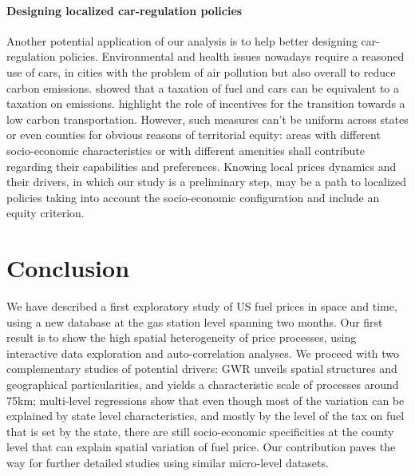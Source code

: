 \documentclass[3p,times,procedia]{elsarticle}
\begin{document}
\paragraph{Designing localized car-regulation policies}

Another potential application of our analysis is to help better designing car-regulation policies. Environmental and health issues nowadays require a reasoned use of cars, in cities with the problem of air pollution but also overall to reduce carbon emissions. \cite{fullerton2002can} showed that a taxation of fuel and cars can be equivalent to a taxation on emissions. \cite{brand2013accelerating} highlight the role of incentives for the transition towards a low carbon transportation. However, such measures can't be uniform across states or even counties for obvious reasons of territorial equity: areas with different socio-economic characteristics or with different amenities shall contribute regarding their capabilities and preferences. Knowing local prices dynamics and their drivers, in which our study is a preliminary step, may be a path to localized policies taking into account the socio-economic configuration and include an equity criterion.

\section{Conclusion}

We have described a first exploratory study of US fuel prices in space and time, using a new database at the gas station level spanning two months. Our first result is to show the high spatial heterogeneity of price processes, using interactive data exploration and auto-correlation analyses. We proceed with two complementary studies of potential drivers: GWR unveils spatial structures and geographical particularities, and yields a characteristic scale of processes around 75km; multi-level regressions show that even though most of the variation can be explained by state level characteristics, and mostly by the level of the tax on fuel that is set by the state, there are still socio-economic specificities at the county level that can explain spatial variation of fuel price. Our contribution paves the way for further detailed studies using similar micro-level datasets.







\end{document}
